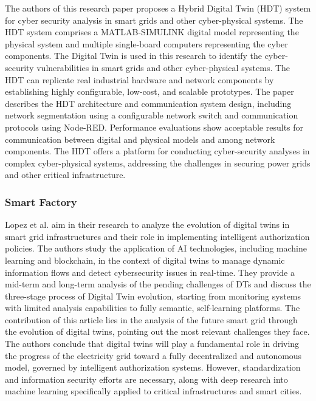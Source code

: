 The authors of this \cite{ayyalusamyHybridDigitalTwin2022a} research paper proposes a Hybrid Digital Twin (HDT) system for cyber security analysis in smart grids and other cyber-physical systems. The HDT system comprises a MATLAB-SIMULINK digital model representing the physical system and multiple single-board computers representing the cyber components. The Digital Twin is used in this research to identify the cyber-security vulnerabilities in smart grids and other cyber-physical systems. The HDT can replicate real industrial hardware and network components by establishing highly configurable, low-cost, and scalable prototypes. The paper describes the HDT architecture and communication system design, including network segmentation using a configurable network switch and communication protocols using Node-RED. Performance evaluations show acceptable results for communication between digital and physical models and among network components. The HDT offers a platform for conducting cyber-security analyses in complex cyber-physical systems, addressing the challenges in securing power grids and other critical infrastructure.







\subsubsection*{Smart Factory}
Lopez et al.\cite{lopezDIGITALTWINSINTELLIGENT2021} aim in their research to analyze the evolution of digital twins in smart grid infrastructures and their role in implementing intelligent authorization policies. The authors study the application of AI technologies, including machine learning and blockchain, in the context of digital twins to manage dynamic information flows and detect cybersecurity issues in real-time. They provide a mid-term and long-term analysis of the pending challenges of DTs and discuss the three-stage process of Digital Twin evolution, starting from monitoring systems with limited analysis capabilities to fully semantic, self-learning platforms. The contribution of this article lies in the analysis of the future smart grid through the evolution of digital twins, pointing out the most relevant challenges they face. The authors conclude that digital twins will play a fundamental role in driving the progress of the electricity grid toward a fully decentralized and autonomous model, governed by intelligent authorization systems. However, standardization and information security efforts are necessary, along with deep research into machine learning specifically applied to critical infrastructures and smart cities.


